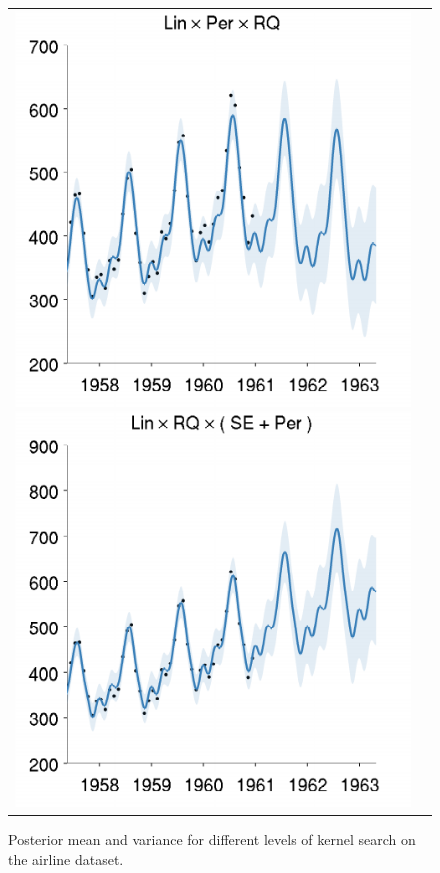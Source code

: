 \documentclass[twoside]{article}
\begin{document}
\begin{figure}[h!]
\begin{tabular}{cc}
\hspace{-1cm} \includegraphics[width=\wag,height=\hag]{../figures/decomposition/01-airline-s_max_level_2/01-airline-s_all_small} 
\hspace{-1cm} \includegraphics[width=\wag,height=\hag]{../figures/decomposition/01-airline-s_max_level_3/01-airline-s_all_small}
\end{tabular}
\caption{Posterior mean and variance for different levels of kernel search on the airline dataset.}
\label{fig:airline_grow}
\end{figure}
\end{document}
